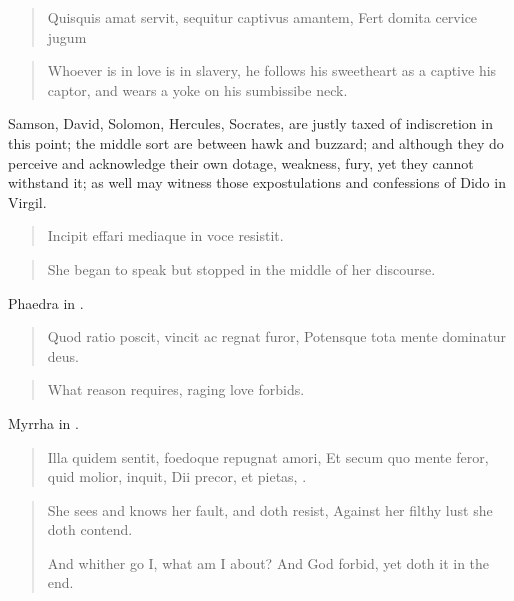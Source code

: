 \begin{latin}
\begin{verse}
Quisquis amat servit, sequitur captivus amantem,
Fert domita cervice jugum
\end{verse}
\end{latin}
\translationrule%
\begin{verse}%
Whoever is in love is in slavery,
he follows his sweetheart as a captive his captor,
and wears a yoke on his sumbissibe neck.
\end{verse}%

Samson, David, Solomon, Hercules, Socrates, \etc{} are justly taxed of
indiscretion in this point; the middle sort are between hawk and
buzzard; and although they do perceive and acknowledge their own
dotage, weakness, fury, yet they cannot withstand it; as well may
witness those expostulations and confessions of Dido in Virgil.

\begin{latin}
\begin{verse}
Incipit effari mediaque in voce resistit.
\end{verse}
\end{latin}
\translationrule%
\begin{verse}%
She began to speak but stopped in the middle of her discourse.
\end{verse}%

Phaedra in \Seneca{}.

\begin{latin}
\begin{verse}
Quod ratio poscit, vincit ac regnat furor,
Potensque tota mente dominatur deus.
\end{verse}
\end{latin}
\translationrule%
\begin{verse}%
What reason requires,
raging love forbids.
\end{verse}%

Myrrha in . \Ovid

\begin{latin}
\begin{verse}
Illa quidem sentit, foedoque repugnat amori,
Et secum quo mente feror, quid molior, inquit,
Dii precor, et pietas, \etc{}.
\end{verse}
\end{latin}
\translationrule%
\begin{verse}%
She sees and knows her fault, and doth resist,
Against her filthy lust she doth contend.

And whither go I, what am I about?
And God forbid, yet doth it in the end.
\end{verse}%

